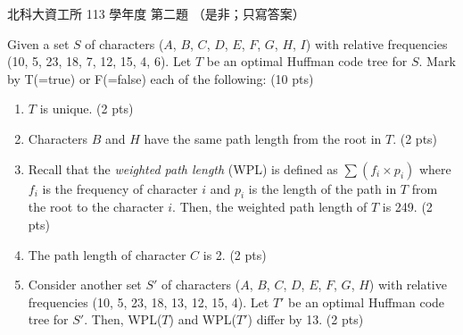 \begin{pastexam}[label={px:ntut-113-ci-02}]{北科大資工所 113 學年度 第二題}
（是非；只寫答案）

Given a set $S$ of characters ($A$, $B$, $C$, $D$, $E$, $F$, $G$, $H$, $I$) with relative frequencies (10, 5,
23, 18, 7, 12, 15, 4, 6). Let $T$ be an optimal Huffman code tree for $S$. Mark by T(=true) or F(=false) each
of the following: (10 pts)
\begin{enumerate}[label=(\arabic*)]
\item $T$ is unique. (2 pts)
\item Characters $B$ and $H$ have the same path length from the root in $T$. (2 pts)
\item Recall that the \textit{weighted path length} (WPL) is defined as $\sum(f_i\times p_i)$ where $f_i$ is
the frequency of character $i$ and $p_i$ is the length of the path in $T$ from the root to the character $i$.
Then, the weighted path length of $T$ is 249. (2 pts)
\item The path length of character $C$ is 2. (2 pts)
\item Consider another set $S'$ of characters ($A$, $B$, $C$, $D$, $E$, $F$, $G$, $H$) with relative
frequencies (10, 5, 23, 18, 13, 12, 15, 4). Let $T'$ be an optimal Huffman code tree for $S'$. Then,
WPL($T$) and WPL($T'$) differ by 13. (2 pts)
\end{enumerate}
\end{pastexam}

